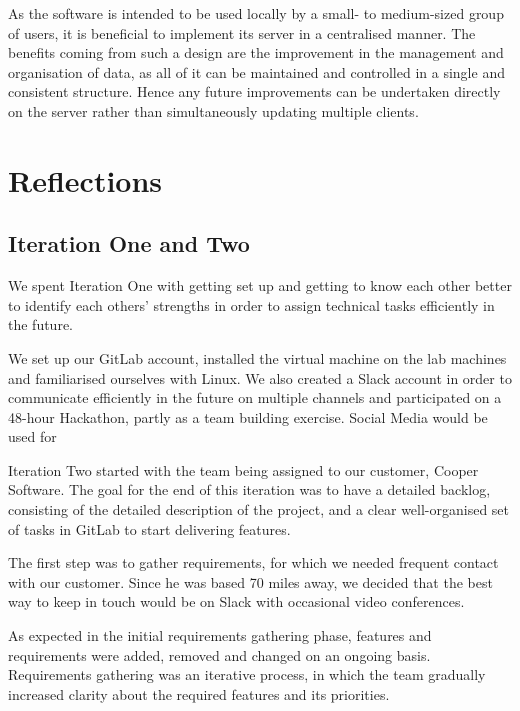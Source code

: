 \documentclass{l3proj}
\begin{document}
As the software is intended to be used locally by a small- to medium-sized group of users, it is beneficial to implement its server in a centralised manner. The benefits coming from such a design are the improvement in the management and organisation of data, as all of it can be maintained and controlled in a single and consistent structure. Hence any future improvements can be undertaken directly on the server rather than simultaneously updating multiple clients.


\section{Reflections}
\subsection{Iteration One and Two}

We spent Iteration One with getting set up and getting to know each other better to identify each others’ strengths  in order to assign technical tasks efficiently in the future.

We set up our GitLab account, installed the virtual machine on the lab machines and familiarised ourselves with Linux.
We also created a Slack account in order to communicate efficiently in the future on multiple channels and participated on a 48-hour Hackathon, partly as a team building exercise. Social Media would be used for  

Iteration Two started with the team being assigned to our customer, Cooper Software. The goal for the end of this iteration was to have a detailed backlog, consisting of the detailed description of the project, and a clear well-organised set of tasks in GitLab to start delivering features.

The first step was to gather requirements, for which we needed frequent contact with our customer. Since he was based 70 miles away, we decided that the best way to keep in touch would be on Slack with occasional video conferences.

As expected in the initial requirements gathering phase, features and requirements were added, removed and changed on an ongoing basis. Requirements gathering was an iterative process, in which the team gradually increased clarity about the required features and its priorities.
\end{document}
